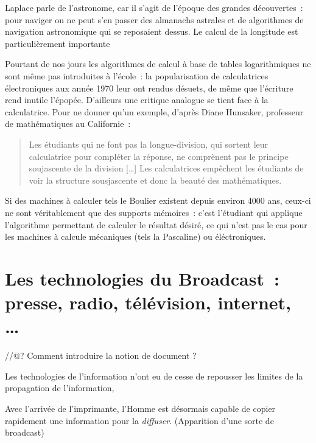 Laplace parle de l'astronome, car il s'agit de l'époque des grandes découvertes~: pour naviger on ne peut s'en passer des almanachs astrales et de algorithmes de navigation astronomique qui se reposaient dessus. Le calcul de la longitude est particulièrement importante 





\cite{longitude}

Pourtant de nos jours les algorithmes de calcul à base de tables logarithmiques ne sont même pas introduites à l'école~: la popularisation de calculatrices électroniques aux année 1970 leur ont rendus désuets, de même que l'écriture rend inutile l'épopée. D'ailleurs une critique analogue se tient face à la calculatrice. Pour ne donner qu'un exemple, d'après Diane Hunsaker, professeur de mathématiques au Californie\cite{eduworld}~:
\begin{quote}
Les étudiants qui ne font pas la longue-division, qui sortent leur calculatrice pour compléter la réponse, ne comprènent pas le principe soujascente de la division [\ldots] Les calculatrices empêchent les étudiants de voir la structure sousjascente et donc la beauté des mathématiques.
\end{quote}
Si des machines à calculer tels le Boulier existent depuis environ 4000 ans, ceux-ci ne sont véritablement que des supports mémoires~: c'est l'étudiant qui applique l'algorithme permettant de calculer le résultat désiré, ce qui n'est pas le cas pour les machines à calcule mécaniques (tels la Pascaline) ou éléctroniques.


\section{Les technologies du \og{}Broadcast\fg{}~: presse, radio, télévision, internet, \ldots}


//@? Comment introduire la notion de document ?

Les technologies de l'information n'ont eu de cesse de repousser les limites de
la propagation de l'information, 

Avec l'arrivée de l'imprimante, l'Homme est désormais capable de copier
rapidement une information pour la \emph{diffuser}. (Apparition d'une sorte
de broadcast)

